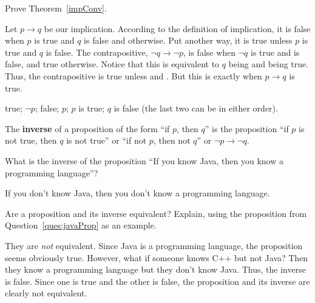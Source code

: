 \begin{fib}
Prove Theorem~\ref{impConv}.
\begin{pf}
Let $p\rightarrow q$ be our implication.  According to the definition of implication, 
it is false when $p$ is true and $q$ is false
and  otherwise.  Put another way, it is true unless $p$ is true and $q$ is false.
The contrapositive, $\neg q\rightarrow \neg p$, is false when 
$\neg q$ is true and  is false, and true otherwise.  Notice that this is equivalent
to $q$ being  and  being true.  
Thus, the contrapositive is true unless  and .
But this is exactly when $p\rightarrow q$ is true.
\end{pf}
\begin{answer}
true; $\neg p$; false; $p$; $p$ is true; $q$ is false (the last two can be in either order).
\end{answer}
\end{fib}

\begin{df}
The {\bf inverse} of a proposition of the form ``if $p$, then $q$'' is the proposition  
``if $p$ is not true, then $q$ is not true''  or ``if not $p$, then not $q$''
or $\neg p \rightarrow \neg q$.
\end{df}

\begin{ques}\label{ques:javaProp}
What is the inverse of the proposition ``If you know Java, then you know a programming language''?\\
\answerline
\begin{answer}
If you don't know Java, then you don't know a programming language.
\end{answer}
\end{ques}

\begin{ques}
Are a proposition and its inverse equivalent?  Explain, using the proposition from 
Question~\ref{ques:javaProp} as an example.\\
\answerlinethree
\begin{answer}
They are {\em not} equivalent.  Since Java is a programming language, the proposition seems obviously true.
However, what if someone knows C++ but not Java?  Then they know a programming language but they don't
know Java. Thus, the inverse is false.  Since one is true and the other is false, 
the proposition and its inverse are clearly not equivalent.
\end{answer}
\end{ques}

